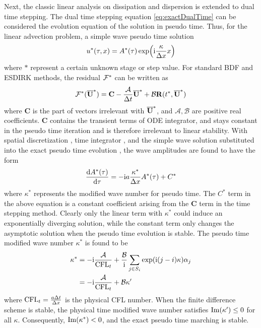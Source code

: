 Next, the classic linear analysis on dissipation and dispersion is
extended to dual time stepping. The dual time
stepping equation \eqref{eq:exactDualTime} can be
considered the evolution equation of the solution in pseudo time.
Thus, for the linear advection problem,
a simple wave pseudo time solution
\begin{equation}
    u^*(\tau,x) = A^*(\tau)\exp(\mathrm{i} \frac{\kappa}{{\Delta} x} x)
    \label{eq:simpleWaveTestTau}
\end{equation}
where $*$ represent a certain unknown stage or step value.
For standard BDF and ESDIRK methods, the residual $\mathcal{F}^*$
can be written as
\begin{equation}
    \mathcal{F}^*(\overline{\mathbf{U}}^*) = \mathbf{C} - \frac{\mathcal{A}}{{\Delta} t} \overline{\mathbf{U}}^* + \mathcal{B}\mathbf{R}(t^*, \overline{\mathbf{U}}^*)
    \label{eq:canonicalFF}
\end{equation}
where $\mathbf{C}$ is the part of vectors irrelevant with $\overline{\mathbf{U}}^*$,
and $\mathcal{A},\mathcal{B}$ are positive real coefficients.
$\mathbf{C}$ contains the transient terms of ODE integrator,
and stays constant in the pseudo time iteration and is
therefore irrelevant to linear stability.
With  spatial discretization ,
time integrator ,
and
the simple wave solution 
substituted into the exact pseudo time evolution ,
the wave amplitudes are found to have the form
\begin{equation}
    \frac{\dd A^*(\tau)}{\dd \tau} = -\mathrm{i} a\frac{\kappa^*}{{\Delta} x}  A^*(\tau) + C^*
    \label{eq:kappaSDefTau}
\end{equation}
where $\kappa^*$ represents the modified wave number for pseudo time.
The $C^*$ term in the above equation is a constant coefficient arising
from the $\mathbf{C}$ term in the time stepping method.
Clearly only the linear term with $\kappa^*$ could induce an exponentially diverging
solution, while the constant term only changes the asymptotic solution
when the pseudo time evolution is stable.
The pseudo time modified wave number $\kappa^*$ is found to be
\begin{equation}
    \begin{aligned}
        \kappa^* & = -\mathrm{i}\frac{\mathcal{A}}{\text{CFL}_t} +
        \frac{\mathcal{B}}{\mathrm{i}} \sum_{j\in S_i}\exp(\mathrm{i} (j-i)\kappa)\alpha_j \\
                 & =-\mathrm{i}\frac{\mathcal{A}}{\text{CFL}_t} + \mathcal{B}\kappa'
    \end{aligned}
\end{equation}
where $\text{CFL}_t = \frac{a{\Delta} t }{{\Delta} x}$ is the physical CFL number.
When the finite difference scheme is stable,
the physical time modified wave number satisfies $\mathrm{Im} (\kappa') \leq 0$ for
all $\kappa$.
Consequently, $\mathrm{Im} (\kappa^*) < 0$, and the exact pseudo time marching
is stable.

